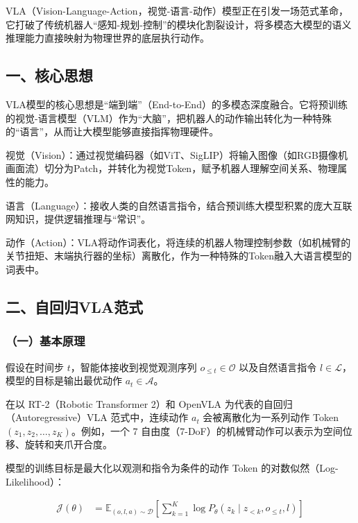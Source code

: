 VLA（Vision-Language-Action，视觉-语言-动作）模型正在引发一场范式革命，它打破了传统机器人``感知-规划-控制''的模块化割裂设计，将多模态大模型的语义推理能力直接映射为物理世界的底层执行动作。

\hypertarget{ux4e00ux6838ux5fc3ux601dux60f3-20}{%
\subsection{一、核心思想}\label{ux4e00ux6838ux5fc3ux601dux60f3-20}}

VLA模型的核心思想是``端到端''（End-to-End）的多模态深度融合。它将预训练的视觉-语言模型（VLM）作为``大脑''，把机器人的动作输出转化为一种特殊的``语言''，从而让大模型能够直接指挥物理硬件。

视觉（Vision）：通过视觉编码器（如ViT、SigLIP）将输入图像（如RGB摄像机画面流）切分为Patch，并转化为视觉Token，赋予机器人理解空间关系、物理属性的能力。

语言（Language）：接收人类的自然语言指令，结合预训练大模型积累的庞大互联网知识，提供逻辑推理与``常识''。

动作（Action）：VLA将动作词表化，将连续的机器人物理控制参数（如机械臂的关节扭矩、末端执行器的坐标）离散化，作为一种特殊的Token融入大语言模型的词表中。

\hypertarget{ux4e8cux81eaux56deux5f52vlaux8303ux5f0f}{%
\subsection{二、自回归VLA范式}\label{ux4e8cux81eaux56deux5f52vlaux8303ux5f0f}}

\hypertarget{ux4e00ux57faux672cux539fux7406-2}{%
\subsubsection{（一）基本原理}\label{ux4e00ux57faux672cux539fux7406-2}}

假设在时间步 \(t\)，智能体接收到视觉观测序列 \(o_{\le t}\in\mathcal{O}\) 以及自然语言指令 \(l\in\mathcal{L}\)，模型的目标是输出最优动作 \(a_t\in\mathcal{A}\)。

在以 RT-2（Robotic Transformer 2）和 OpenVLA 为代表的自回归（Autoregressive）VLA 范式中，连续动作 \(a_t\) 会被离散化为一系列动作 Token \((z_1,z_2,\ldots,z_K)\)。例如，一个 7 自由度（7-DoF）的机械臂动作可以表示为空间位移、旋转和夹爪开合度。

模型的训练目标是最大化以观测和指令为条件的动作 Token 的对数似然（Log-Likelihood）：

\[
\begin{aligned}
\mathcal{J}(\theta)
&=
\mathbb{E}_{(o,l,a)\sim\mathcal{D}}
\left[
\sum_{k=1}^{K}
\log P_{\theta}(z_k\mid z_{<k}, o_{\le t}, l)
\right]
\end{aligned}
\]

